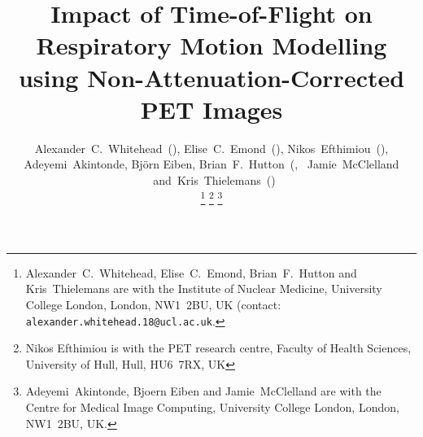 \documentclass[journal]{IEEEtran}
\begin{document}
%
\title{Impact of Time-of-Flight on Respiratory Motion Modelling using Non-Attenuation-Corrected PET Images}
%
%
%

\author{Alexander~C.~Whitehead~(),
        Elise~C.~Emond~(),
        Nikos~Efthimiou~(),
        Adeyemi~Akintonde,
        Bj{\"o}rn Eiben,
        Brian~F.~Hutton~(,
        ~Jamie~McClelland
        ~and~Kris~Thielemans~()%

\thanks{Alexander~C.~Whitehead, Elise~C.~Emond, Brian~F.~Hutton and Kris~Thielemans are with the Institute of Nuclear Medicine, University College London, London, NW1~2BU, UK (contact: \texttt{alexander.whitehead.18@ucl.ac.uk}.}%
\thanks{Nikos Efthimiou is with the PET research centre, Faculty of Health Sciences, University of Hull, Hull, HU6~7RX, UK}%
\thanks{Adeyemi~Akintonde, Bjoern Eiben and Jamie~McClelland are with the Centre for Medical Image Computing, University College London, London, NW1~2BU, UK.}%
}

% 
%
\end{document}
